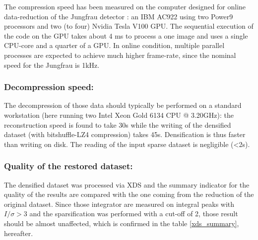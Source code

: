 \documentclass[a4paper,12pt,oneside]{article}              %
\begin{document}

The compression speed has been measured on the computer designed for online data-reduction of the Jungfrau detector \cite{sri2021}: 
an IBM AC922 using two Power9 processors and two (to four) Nvidia Tesla V100 GPU. 
The sequential execution of the code on the GPU takes about 4 ms to process a one image and uses a single CPU-core and a quarter of a GPU. 
In online condition, multiple parallel processes are expected to achieve much higher frame-rate, since the nominal speed for the Jungfrau is 1kHz.

\subsubsection{Decompression speed:} 
The decompression of those data should typically be performed on a standard workstation (here running two Intel Xeon Gold 6134 CPU @ 3.20GHz): the reconstruction speed is found to take 30s while the writing of the densified dataset (with bitshuffle-LZ4 compression) takes 45s. 
Densification is thus faster than writing on disk.
The reading of the input sparse dataset is negligible (<2s).

\subsubsection{Quality of the restored dataset:} 
The densified dataset was processed via XDS and the summary indicator for the quality of the results are compared with the one coming from the reduction of the original dataset. 
Since those integrator are measured on integral peaks with $I/\sigma>3$ and the sparsification was performed
with a cut-off of 2, those result should be almost unaffected, which is confirmed in the table \ref{xds_summary}, hereafter.
\end{document}
